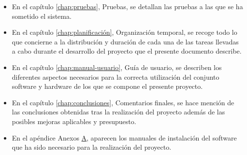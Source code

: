 \begin{itemize}
\item En el capítulo \ref{chap:pruebas}, Pruebas, se detallan las pruebas a las que se ha sometido el sistema.

\item En el capítulo \ref{chap:planificación}, Organización temporal, se recoge todo lo que concierne a la distribución y duración de cada una de las tareas llevadas a cabo durante el desarrollo del proyecto que el presente documento describe.

\item En el capítulo \ref{chap:manual-usuario}, Guía de usuario, se describen los diferentes aspectos necesarios para la correcta utilización del conjunto software y hardware de los que se compone el presente proyecto.

\item En el capítulo \ref{chap:conclusiones}, Comentarios finales, se hace mención de las conclusiones obtenidas tras la realización del proyecto además de las posibles mejoras aplicables y presupuesto.

\item En el apéndice Anexos  \hyperref[appendix:anexos]{A}, aparecen los manuales de instalación del software que ha sido necesario para la realización del proyecto.

\end{itemize}
